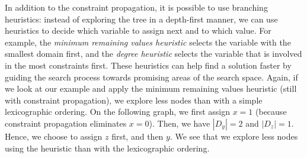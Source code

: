 \documentclass[12pt, openany]{report}
\theoremstyle{definition}
\begin{document}
\begin{figure}[H]
\centering
\end{figure}
In addition to the constraint propagation, it is possible to use branching heuristics: instead of exploring the tree in a depth-first manner, we can use heuristics to decide which variable to assign next and to which value. For example, the \textit{minimum remaining values heuristic} selects the variable with the smallest domain first, and the \textit{degree heuristic} selects the variable that is involved in the most constraints first. These heuristics can help find a solution faster by guiding the search process towards promising areas of the search space. Again, if we look at our example and apply the minimum remaining values heuristic (still with constraint propagation), we explore less nodes than with a simple lexicographic ordering. On the following graph, we first assign $x=1$ (because constraint propagation eliminates $x=0$). Then, we have $|D_y|=2$ and $|D_z| = 1$. Hence, we choose to assign $z$ first, and then $y$. We see that we explore less nodes using the heuristic than with the lexicographic ordering.
\end{document}
